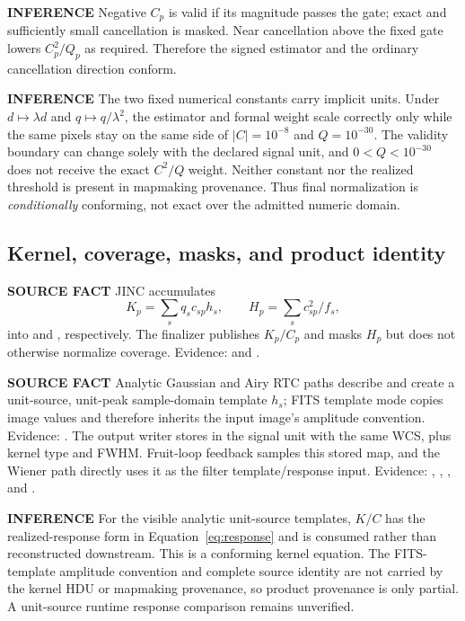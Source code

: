 \documentclass[10pt]{article}
\newcommand{\srclabel}{\textbf{SOURCE FACT}}
\newcommand{\inflabel}{\textbf{INFERENCE}}
\begin{document}
\inflabel{} Negative $C_p$ is valid if its magnitude passes the gate; exact
and sufficiently small cancellation is masked.  Near cancellation above the
fixed gate lowers $C_p^2/Q_p$ as required.  Therefore the signed estimator and
the ordinary cancellation direction conform.

\inflabel{} The two fixed numerical constants carry implicit units.  Under
$d\mapsto\lambda d$ and $q\mapsto q/\lambda^2$, the estimator and formal
weight scale correctly only while the same pixels stay on the same side of
$|C|=10^{-8}$ and $Q=10^{-30}$.  The validity boundary can change solely with
the declared signal unit, and $0<Q<10^{-30}$ does not receive the exact
$C^2/Q$ weight.  Neither constant nor the realized threshold is present in
mapmaking provenance.  Thus final normalization is \emph{conditionally}
conforming, not exact over the admitted numeric domain.

\subsection{Kernel, coverage, masks, and product identity}

\srclabel{} JINC accumulates
\begin{equation}
 K_p=\sum_s q_sc_{sp}h_s,\qquad
 H_p=\sum_s c_{sp}^2/f_s,
\end{equation}
into  and , respectively.  The finalizer
publishes $K_p/C_p$ and masks $H_p$ but does not otherwise normalize coverage.
Evidence:  and
.

\srclabel{} Analytic Gaussian and Airy RTC paths describe and create a
unit-source, unit-peak sample-domain template $h_s$; FITS template mode copies
image values and therefore inherits the input image's amplitude convention.
Evidence: .
The output writer stores  in the signal unit with the same
WCS, plus kernel type and FWHM.  Fruit-loop feedback samples this stored map,
and the Wiener path directly uses it as the filter template/response input.
Evidence: ,
,
, and
.

\inflabel{} For the visible analytic unit-source templates, $K/C$ has the
realized-response form in Equation~\eqref{eq:response} and is consumed rather
than reconstructed downstream.  This is a conforming kernel equation.  The
FITS-template amplitude convention and complete source identity are not
carried by the kernel HDU or mapmaking provenance, so product provenance is
only partial.  A unit-source runtime response comparison remains unverified.
\end{document}

